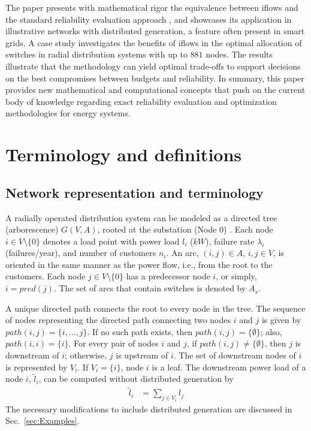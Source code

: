 \documentclass{article}
\begin{document}
The paper presents with mathematical rigor the equivalence between iflows and the standard reliability evaluation approach \cite{billinton}, and showcases its application in illustrative networks with distributed generation, a feature often present in smart grids. A case study investigates the benefits of iflows in the optimal allocation of switches in radial distribution systems with up to $881$ nodes.
The results illustrate that the methodology can yield optimal trade-offs to support decisions on the best compromises between budgets and reliability. In summary, this paper provides new mathematical and computational concepts that push on the current body of knowledge regarding exact reliability evaluation and optimization methodologies for energy systems.



\section{Terminology and definitions} \label{sec:Terminology}

\subsection{Network representation and terminology} \label{sec:mainConcepts}

A radially operated distribution system can be modeled as a directed tree (arborescence) $G(V,A)$, rooted at the substation (Node $0$) \cite{ahuja93}. Each node $i \in V \setminus \{0\}$ denotes a load point with power load $l_i$ ($kW$), failure rate $\lambda_i$ (failures/year), and number of customers $n_i$. An arc, $(i,j) \in A$, $i,j \in V$, is oriented in the same manner as the power flow, i.e., from the root to the customers. Each node $j \in V \setminus \{ 0 \}$ has a predecessor node $i$, or simply, $i=pred(j)$. The set of arcs that contain switches is denoted by $A_{s}$.

A unique directed path connects the root to every node in the tree. The sequence of nodes representing the directed path connecting two nodes $i$ and $j$ is given by $path(i,j) = \{i, \ldots, j\}$. If no such path exists, then $path(i,j) = \{\emptyset\}$; also, $path(i,i) = \{i\}$. For every pair of nodes $i$ and $j$, if $path(i,j) \neq \{\emptyset\}$, then $j$ is downstream of $i$; otherwise, $j$ is upstream of $i$.
The set of downstream nodes of $i$ is represented by $V_i$. If $V_i = \{i\}$, node $i$ is a leaf. The downstream power load of a node $i$, $\tilde{l}_i$, can be computed without distributed generation by
\begin{align} 
 \displaystyle
 \tilde{l}_i &= \sum_{j \in V_i}{l_j} \label{eq:tildepi}
\end{align}
The necessary  modifications to include distributed generation are discussed in Sec.~\ref{sec:Examples}.
\end{document}

